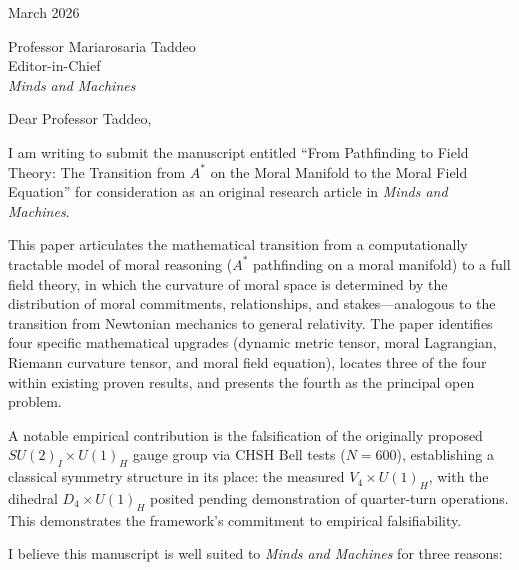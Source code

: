 \documentclass[12pt]{article}
\begin{document}
\noindent
March 2026

\bigskip

\noindent
Professor Mariarosaria Taddeo\\
Editor-in-Chief\\
\textit{Minds and Machines}

\bigskip

\noindent
Dear Professor Taddeo,

\bigskip

I am writing to submit the manuscript entitled ``From Pathfinding to Field Theory: The Transition from $A^*$ on the Moral Manifold to the Moral Field Equation'' for consideration as an original research article in \textit{Minds and Machines}.

This paper articulates the mathematical transition from a computationally tractable model of moral reasoning ($A^*$ pathfinding on a moral manifold) to a full field theory, in which the curvature of moral space is determined by the distribution of moral commitments, relationships, and stakes---analogous to the transition from Newtonian mechanics to general relativity. The paper identifies four specific mathematical upgrades (dynamic metric tensor, moral Lagrangian, Riemann curvature tensor, and moral field equation), locates three of the four within existing proven results, and presents the fourth as the principal open problem.

A notable empirical contribution is the falsification of the originally proposed $SU(2)_I \times U(1)_H$ gauge group via CHSH Bell tests ($N = 600$), establishing a classical symmetry structure in its place: the measured $V_4 \times U(1)_H$, with the dihedral $D_4 \times U(1)_H$ posited pending demonstration of quarter-turn operations. This demonstrates the framework's commitment to empirical falsifiability.

I believe this manuscript is well suited to \textit{Minds and Machines} for three reasons:
\end{document}
